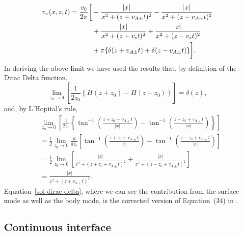 \documentclass[12pt]{../style-files/ociamthesis}
\begin{document}
\begin{align}
v_x(x, z, t) = \frac{v_0}{2\pi} \bigg[ &- \frac{|x|}{x^2 + (z + v_{A\pm}t)^2} - \frac{|x|}{x^2 + (z - v_{A\pm}t)^2} \notag \\
&+ \frac{|x|}{x^2 + (z + v_st)^2} + \frac{|x|}{x^2 + (z - v_st)^2} \notag \\
&+ \pi\{\delta(z + v_{A\pm}t) + \delta(z - v_{A\pm}t)\} \bigg]. \label{sol dirac delta}
\end{align}
In deriving the above limit we have used the results that, by definition of the Dirac Delta function,
\begin{equation}
\lim_{z_0 \to 0} \left[\frac{1}{2z_0} \left\{H(z + z_0) - H(z - z_0)\right\}\right] = \delta(z),
\end{equation}
and, by L'Hopital's rule,
\begin{align}
&\lim_{z_0 \to 0} \left[\frac{1}{2z_0}\left\{\tan^{-1}\left( \frac{z + z_0 + v_{A\pm}t}{|x|} \right) - \tan^{-1}\left( \frac{z - z_0 + v_{A\pm}t}{|x|} \right)\right\}\right] \\
&= \frac{1}{2} \lim_{z_0 \to 0} \frac{d}{dz_0} \left[\tan^{-1}\left( \frac{z + z_0 + v_{A\pm}t}{|x|} \right) - \tan^{-1}\left( \frac{z - z_0 + v_{A\pm}t}{|x|} \right)\right] \\
&= \frac{1}{2} \lim_{z_0 \to 0} \left[ \frac{|x|}{x^2 + (z + z_0 + v_{A\pm}t)^2} + \frac{|x|}{x^2 + (z - z_0 + v_{A\pm}t)^2} \right] \\
&= \frac{|x|}{x^2 + (z + v_{A\pm}t)^2}.
\end{align}
Equation~\eqref{sol dirac delta}, where we can see the contribution from the surface mode as well as the body mode, is the corrected version of Equation~(34) in \cite{rae_etal81}.






\color{red}
\subsection{Continuous interface}
\color{black}
\end{document}
